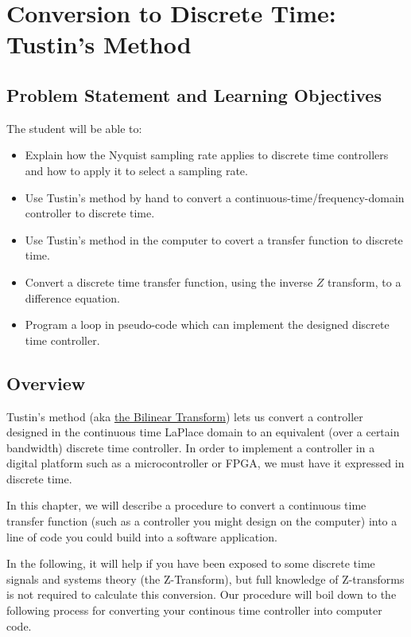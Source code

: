 %
%
%

\chapter{Conversion to Discrete Time: Tustin's Method}

\section{Problem Statement and Learning Objectives}

The student will be able to:
\begin{itemize}
    \item Explain how the Nyquist sampling rate applies to discrete  time controllers and
    how to apply it to select a sampling rate.
    \item Use Tustin's method by hand to convert a continuous-time/frequency-domain controller
    to discrete time.
    \item Use Tustin's method in the computer to covert a transfer function to discrete time.
    \item Convert a discrete time transfer function, using the inverse $Z$ transform, to
    a difference equation.
    \item  Program a loop in pseudo-code which can implement the designed discrete time controller.
\end{itemize}

\section{Overview}
Tustin's method (aka \href{https://en.wikipedia.org/wiki/Bilinear_transform}{the Bilinear Transform}) lets us convert a controller designed in the continuous time
LaPlace domain to an equivalent (over a certain bandwidth) discrete time
controller.  In order to implement a controller in a digital platform such as a
microcontroller or FPGA, we must have it expressed in discrete time.

In this chapter, we will describe a procedure to convert a continuous time transfer function (such as a controller you might design on  the  computer) into a line of code you could build into a software application. 	%

In the following, it will help if you have been exposed to some discrete time signals and systems theory (the Z-Transform), but full knowledge of Z-transforms is not required to calculate this conversion.
Our procedure will boil down to the following process for converting your continous time controller
into computer code.

